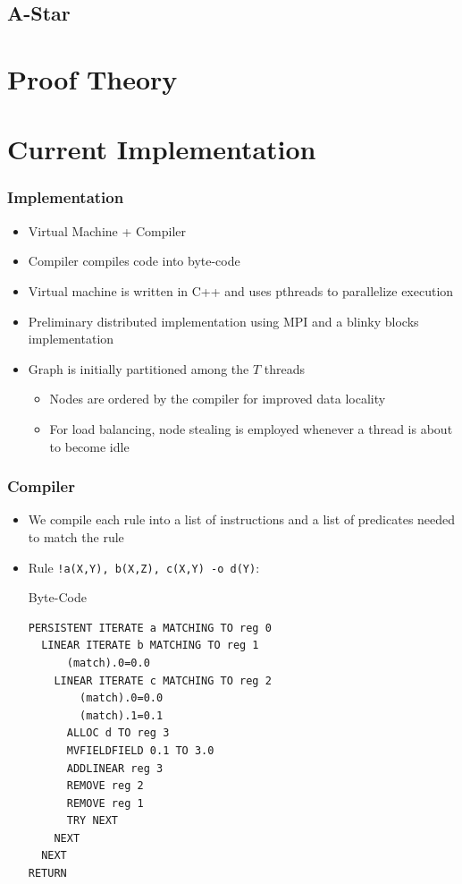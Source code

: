 \documentclass{beamer}
\begin{document}
\subsection{A-Star}

\section{Proof Theory}

\section{Current Implementation}

\begin{frame}[fragile]
   \frametitle{Implementation}
   \begin{itemize}
      \item Virtual Machine + Compiler
      \item Compiler compiles code into byte-code
      \item Virtual machine is written in C++ and uses pthreads to parallelize execution
      \item Preliminary distributed implementation using MPI and a blinky blocks implementation
      \item Graph is initially partitioned among the $T$ threads
      \begin{itemize}
         \item Nodes are ordered by the compiler for improved data locality
         \item For load balancing, node stealing is employed whenever a thread is about to become idle
      \end{itemize}
   \end{itemize}
\end{frame}

\begin{frame}[fragile]
   \frametitle{Compiler}
   \begin{itemize}
      \item We compile each rule into a list of instructions and a list of predicates needed to match the rule
      \item Rule \texttt{!a(X,Y), b(X,Z), c(X,Y) -o d(Y)}:
      \begin{block}{Byte-Code}
         \scriptsize\begin{verbatim}
PERSISTENT ITERATE a MATCHING TO reg 0
  LINEAR ITERATE b MATCHING TO reg 1
      (match).0=0.0
    LINEAR ITERATE c MATCHING TO reg 2
        (match).0=0.0
        (match).1=0.1
      ALLOC d TO reg 3
      MVFIELDFIELD 0.1 TO 3.0
      ADDLINEAR reg 3
      REMOVE reg 2
      REMOVE reg 1
      TRY NEXT
    NEXT
  NEXT
RETURN
         \end{verbatim}
      \end{block}
   \end{itemize}
\end{frame}
\end{document}
